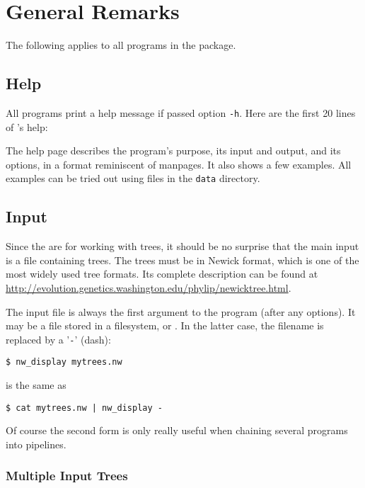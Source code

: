 
\chapter{General Remarks}
\label{chap_general}

The following applies to all programs in the \nutils{} package.

\section{Help}
\label{sct_help}

All programs print a help message if passed option \texttt{-h}. Here are the
first 20 lines of \nwindent{}'s help:


\begin{samepage}

\end{samepage}

The help page describes the program's purpose, its input and output, and its
options, in a format reminiscent of \unix{} manpages. It also shows a few
examples. All examples can be tried out using files in the \texttt{data}
directory.

\section{Input}
\label{sct_input}

Since the \nutils{} are for working with trees, it should be no surprise
that the main input is a file containing trees. The trees must be in
Newick format, which is one of the most widely used tree formats. Its
complete description can be found at
\url{http://evolution.genetics.washington.edu/phylip/newicktree.html}.

The input file is always the first argument to the program (after any options).
It may be a file stored in a filesystem, or \stdin{}. In the latter case, the
filename is replaced by a '\texttt{-}' (dash):
\begin{samepage}
\begin{verbatim}
$ nw_display mytrees.nw
\end{verbatim}
is the same as
\begin{verbatim}
$ cat mytrees.nw | nw_display -
\end{verbatim}
\end{samepage}
Of course the second form is only really useful when chaining several programs into pipelines.

\subsection{Multiple Input Trees}

